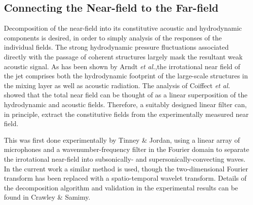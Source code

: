 \documentclass[english]{aiaa-tc}
\begin{document}
\subsection{Connecting the Near-field to the Far-field}
Decomposition of the near-field into its constitutive acoustic and hydrodynamic components is desired, in order to simply analysis of the responses of the individual fields.
The strong hydrodynamic pressure fluctuations associated directly with the passage of coherent structures largely mask the resultant weak acoustic signal.
As has been shown by Arndt \textit{et al.}\cite{Arndt1997},the irrotational near field of the jet comprises both the hydrodynamic footprint of the large-scale structures in the mixing layer as well as acoustic radiation.
The analysis of Coiffect \textit{et al.}\cite{Coiffet2006} showed that the total near field can be thought of as a linear superposition of the hydrodynamic and acoustic fields.
Therefore, a suitably designed linear filter can, in principle, extract the constitutive fields from the experimentally measured near field.

This was first done experimentally by Tinney \& Jordan\cite{Tinney2008}, using a linear array of microphones and a wavenumber-frequency filter in the Fourier domain to separate the irrotational near-field into subsonically- and supersonically-convecting waves.
In the current work a similar method is used, though the two-dimensional Fourier transform has been replaced with a spatio-temporal wavelet transform.
Details of the decomposition algorithm and validation in the experimental results can be found in Crawley \& Samimy\cite{crawley2014b}.
\end{document}
